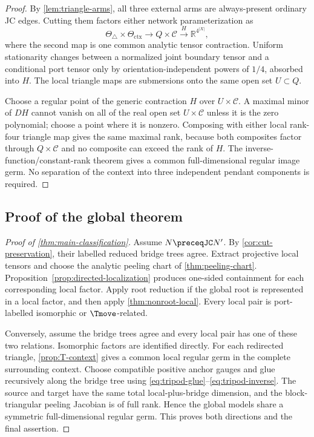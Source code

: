 \begin{proof}
By \cref{lem:triangle-arms}, all three external arms are always-present ordinary JC edges.  Cutting them factors either network parameterization as
\[
\Theta_{\triangle}\times\Theta_{\mathrm{ctx}}
\longrightarrow Q\times\mathcal C
\overset{H}{\longrightarrow}\mathbb R^{4^{|X|}},
\]
where the second map is one common analytic tensor contraction.  Uniform stationarity changes between a normalized joint boundary tensor and a conditional port tensor only by orientation-independent powers of $1/4$, absorbed into $H$.  The local triangle maps are submersions onto the same open set $U\subset Q$.

Choose a regular point of the generic contraction $H$ over $U\times\mathcal C$.  A maximal minor of $DH$ cannot vanish on all of the real open set $U\times\mathcal C$ unless it is the zero polynomial; choose a point where it is nonzero.  Composing with either local rank-four triangle map gives the same maximal rank, because both composites factor through $Q\times\mathcal C$ and no composite can exceed the rank of $H$.  The inverse-function/constant-rank theorem gives a common full-dimensional regular image germ.  No separation of the context into three independent pendant components is required.
\end{proof}



\subsection{Proof of the global theorem}

\begin{proof}[Proof of \cref{thm:main-classification}]
Assume $N\preceqJC N'$.  By \cref{cor:cut-preservation}, their labelled reduced bridge trees agree.  Extract projective local tensors and choose the analytic peeling chart of \cref{thm:peeling-chart}.  Proposition~\ref{prop:directed-localization} produces one-sided containment for each corresponding local factor.  Apply root reduction if the global root is represented in a local factor, and then apply \cref{thm:nonroot-local}.  Every local pair is port-labelled isomorphic or $\Tmove$-related.

Conversely, assume the bridge trees agree and every local pair has one of these two relations.  Isomorphic factors are identified directly.  For each redirected triangle, \cref{prop:T-context} gives a common local regular germ in the complete surrounding context.  Choose compatible positive anchor gauges and glue recursively along the bridge tree using \eqref{eq:tripod-glue}--\eqref{eq:tripod-inverse}.  The source and target have the same total local-plus-bridge dimension, and the block-triangular peeling Jacobian is of full rank.  Hence the global models share a symmetric full-dimensional regular germ.  This proves both directions and the final assertion.
\end{proof}
